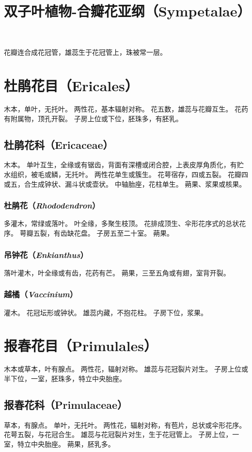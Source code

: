 \documentclass[11pt]{article}
\title{双子叶植物-合瓣花亚纲（Sympetalae）}
\date{}
\begin{document}
\begin{sloppypar}
  \maketitle

  \linenumbers
花瓣连合成花冠管，雄蕊生于花冠管上，珠被常一层。

\section{杜鹃花目（Ericales）}
木本，单叶，无托叶。
两性花，基本辐射对称。
花五数，雄蕊与花瓣互生。
花药有附属物，顶孔开裂。
子房上位或下位，胚珠多，有胚乳。

\subsection{杜鹃花科（Ericaceae）}
木本。
单叶互生，全缘或有锯齿，背面有深槽或闭合腔，上表皮厚角质化，有贮水组织，被毛或鳞，无托叶。
两性花单生或簇生。
花萼宿存，四或五裂。
花瓣四或五，合生成钟状、漏斗状或壶状。
中轴胎座，花柱单生。
蒴果、浆果或核果。

\subsubsection{杜鹃花（\textit{Rhododendron}）}
多灌木，常绿或落叶。
叶全缘，多聚生枝顶。
花排成顶生、伞形花序式的总状花序。
萼瓣五裂，有齿缺花盘。
子房五至二十室。
蒴果。

\subsubsection{吊钟花（\textit{Enkianthus}）}
落叶灌木，叶全缘或有齿，花药有芒。
蒴果，三至五角或有翅，室背开裂。

\subsubsection{越橘（\textit{Vaccinium}）}
灌木。
花冠坛形或钟状。
雄蕊内藏，不抱花柱。
子房下位，浆果。

\section{报春花目（Primulales）}
木本或草本，叶有腺点。
两性花，辐射对称。
雄蕊与花冠裂片对生。
子房上位或半下位，一室，胚珠多，特立中央胎座。

\subsection{报春花科（Primulaceae）}
草本，有腺点。
单叶，无托叶。
两性花，辐射对称，有苞片，总状或伞形花序。
花萼五裂，与花冠合生。
雄蕊与花冠裂片对生，生于花冠管上。
子房上位，一室，特立中央胎座。
蒴果，胚乳多。


\end{sloppypar}
\end{document}
